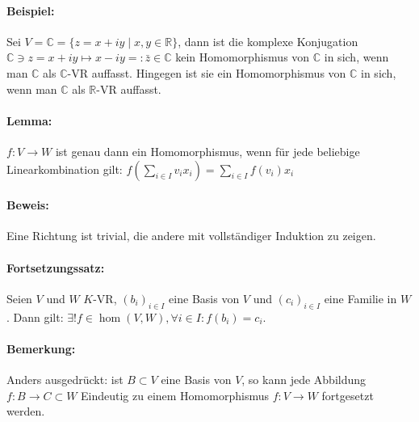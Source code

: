 \paragraph{Beispiel:}
	Sei $V = \mathbb{C} = \{z = x+iy\mid x,y\in \mathbb{R}\}$, dann ist die komplexe Konjugation $\mathbb{C}\ni z = x+iy \mapsto x-iy =: \bar{z} \in \mathbb{C}$ kein Homomorphismus von $\mathbb{C}$ in sich, wenn man $\mathbb{C}$ als $\mathbb{C}$-VR auffasst. Hingegen ist sie ein Homomorphismus von $\mathbb{C}$ in sich, wenn man $\mathbb{C}$ als $ \mathbb{R} $-VR auffasst.
\paragraph{Lemma:}
	$f:V\to W$ ist genau dann ein Homomorphismus, wenn für jede beliebige Linearkombination gilt: $f(\sum_{i\in I}v_ix_i) = \sum_{i\in I}f(v_i)x_i$

\paragraph{Beweis:}
	Eine Richtung ist trivial, die andere mit vollständiger Induktion zu zeigen.

\paragraph{Fortsetzungssatz:} 
	Seien $ V $ und $ W $ $K$-VR, $(b_i)_{i\in I}$ eine Basis von $ V $ und $(c_i)_{i\in I}$ eine Familie in $ W $. Dann gilt: $\exists!f\in \hom(V,W), \forall i\in I: f(b_i) = c_i$.
    
\paragraph{Bemerkung:}
        Anders ausgedrückt: ist $B\subset V$ eine Basis von $ V $, so kann jede Abbildung $f: B\to C\subset W$ Eindeutig zu einem Homomorphismus $f: V\to W$ fortgesetzt werden.
    
